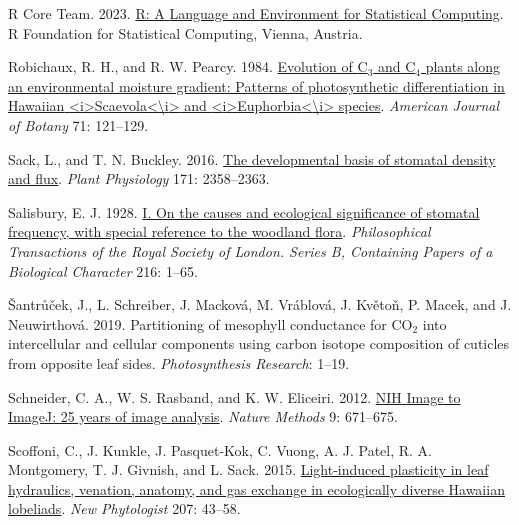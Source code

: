 \documentclass[
  letterpaper,
  DIV=11,
  numbers=noendperiod]{scrartcl}
\newlength{\cslhangindent}
\newlength{\cslentryspacingunit} %
\newenvironment{CSLReferences}[2] %
 {%
  \setlength{\parindent}{0pt}
  \ifodd #1
  \let\oldpar\par
  \def\par{\hangindent=\cslhangindent\oldpar}
  \fi
  \setlength{\parskip}{#2\cslentryspacingunit}
 }%
 {}
\begin{document}
\begin{CSLReferences}{1}{0}
\leavevmode{}%
R Core Team. 2023. \href{http://www.R-project.org/}{R: {A} {Language}
and {Environment} for {Statistical} {Computing}}. R Foundation for
Statistical Computing, Vienna, Austria.

\leavevmode{}%
Robichaux, R. H., and R. W. Pearcy. 1984.
\href{https://doi.org/10.1002/j.1537-2197.1984.tb12492.x}{Evolution of
{C}\(_{\textrm{3}}\) and {C}\(_{\textrm{4}}\) plants along an
environmental moisture gradient: Patterns of photosynthetic
differentiation in {Hawaiian}
{\textless{}}i{\textgreater{}}{Scaevola}{\textless{}}{\textbackslash{}}i{\textgreater{}}
and
{\textless{}}i{\textgreater{}}{Euphorbia}{\textless{}}{\textbackslash{}}i{\textgreater{}}
species}. \emph{American Journal of Botany} 71: 121--129.

\leavevmode{}%
Sack, L., and T. N. Buckley. 2016.
\href{https://doi.org/10.1104/pp.16.00476}{The developmental basis of
stomatal density and flux}. \emph{Plant Physiology} 171: 2358--2363.

\leavevmode{}%
Salisbury, E. J. 1928. \href{https://doi.org/10.1098/rstb.1928.0001}{I.
{On} the causes and ecological significance of stomatal frequency, with
special reference to the woodland flora}. \emph{Philosophical
Transactions of the Royal Society of London. Series B, Containing Papers
of a Biological Character} 216: 1--65.

\leavevmode{}%
Šantrůček, J., L. Schreiber, J. Macková, M. Vráblová, J. Květoň, P.
Macek, and J. Neuwirthová. 2019. Partitioning of mesophyll conductance
for {CO}\(_{\textrm{2}}\) into intercellular and cellular components
using carbon isotope composition of cuticles from opposite leaf sides.
\emph{Photosynthesis Research}: 1--19.

\leavevmode{}%
Schneider, C. A., W. S. Rasband, and K. W. Eliceiri. 2012.
\href{https://doi.org/10.1038/nmeth.2089}{{NIH} {Image} to {ImageJ}: 25
years of image analysis}. \emph{Nature Methods} 9: 671--675.

\leavevmode{}%
Scoffoni, C., J. Kunkle, J. Pasquet-Kok, C. Vuong, A. J. Patel, R. A.
Montgomery, T. J. Givnish, and L. Sack. 2015.
\href{https://doi.org/10.1111/nph.13346}{Light-induced plasticity in
leaf hydraulics, venation, anatomy, and gas exchange in ecologically
diverse {Hawaiian} lobeliads}. \emph{New Phytologist} 207: 43--58.


\end{CSLReferences}
\end{document}
